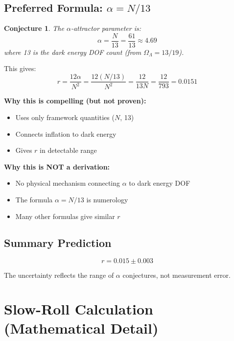 \documentclass[12pt,a4paper]{article}
\newtheorem{conjecture}{Conjecture}
\begin{document}
\subsection{Preferred Formula: $\alpha = N/13$}

\begin{conjecture}
The $\alpha$-attractor parameter is:
\begin{equation}
\alpha = \frac{N}{13} = \frac{61}{13} \approx 4.69
\end{equation}
where 13 is the dark energy DOF count (from $\Omega_\Lambda = 13/19$).
\end{conjecture}

This gives:
\begin{equation}
r = \frac{12\alpha}{N^2} = \frac{12(N/13)}{N^2} = \frac{12}{13N} = \frac{12}{793} = 0.0151
\end{equation}

\textbf{Why this is compelling (but not proven):}
\begin{itemize}
    \item Uses only framework quantities ($N$, 13)
    \item Connects inflation to dark energy
    \item Gives $r$ in detectable range
\end{itemize}

\textbf{Why this is NOT a derivation:}
\begin{itemize}
    \item No physical mechanism connecting $\alpha$ to dark energy DOF
    \item The formula $\alpha = N/13$ is numerology
    \item Many other formulas give similar $r$
\end{itemize}

\subsection{Summary Prediction}

\begin{equation}
\boxed{r = 0.015 \pm 0.003}
\end{equation}

The uncertainty reflects the range of $\alpha$ conjectures, not measurement error.

\section{Slow-Roll Calculation (Mathematical Detail)}
\end{document}
